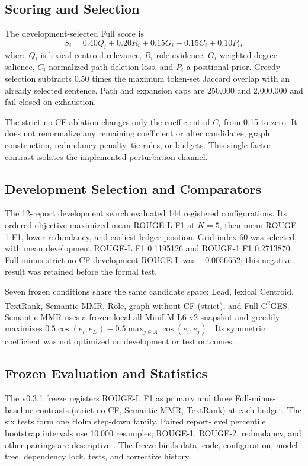 \documentclass[applsci,article,submit,moreauthors]{Definitions/mdpi}
\newcommand{\cges}{C\textsuperscript{2}GES}
\begin{document}
\subsection{Scoring and Selection}

The development-selected Full score is
\begin{equation}
S_i=0.40Q_i+0.20R_i+0.15G_i+0.15C_i+0.10P_i,
\end{equation}
where $Q_i$ is lexical centroid relevance, $R_i$ role evidence, $G_i$ weighted-degree salience, $C_i$ normalized path-deletion loss, and $P_i$ a positional prior. Greedy selection subtracts $0.50$ times the maximum token-set Jaccard overlap with an already selected sentence. Path and expansion caps are 250,000 and 2,000,000 and fail closed on exhaustion.

The strict no-CF ablation changes only the coefficient of $C_i$ from 0.15 to zero. It does not renormalize any remaining coefficient or alter candidates, graph construction, redundancy penalty, tie rules, or budgets. This single-factor contrast isolates the implemented perturbation channel.

\subsection{Development Selection and Comparators}

The 12-report development search evaluated 144 registered configurations. Its ordered objective maximized mean ROUGE-L F1 at $K=5$, then mean ROUGE-1 F1, lower redundancy, and earliest ledger position. Grid index 60 was selected, with mean development ROUGE-L F1 0.1195126 and ROUGE-1 F1 0.2713870. Full minus strict no-CF development ROUGE-L was $-0.0056652$; this negative result was retained before the formal test.

Seven frozen conditions share the same candidate space: Lead, lexical Centroid, TextRank, Semantic-MMR, Role, graph without CF (strict), and Full \cges{}. Semantic-MMR uses a frozen local all-MiniLM-L6-v2 snapshot and greedily maximizes $0.5\cos(e_i,\bar e_D)-0.5\max_{j\in A}\cos(e_i,e_j)$ \cite{reimers2019sentencebert}. Its symmetric coefficient was not optimized on development or test outcomes.

\subsection{Frozen Evaluation and Statistics}

The v0.3.1 freeze registers ROUGE-L F1 as primary and three Full-minus-baseline contrasts (strict no-CF, Semantic-MMR, TextRank) at each budget. The six tests form one Holm step-down family. Paired report-level percentile bootstrap intervals use 10,000 resamples; ROUGE-1, ROUGE-2, redundancy, and other pairings are descriptive \cite{cameron2008bootstrap}. The freeze binds data, code, configuration, model tree, dependency lock, tests, and corrective history.
\end{document}

